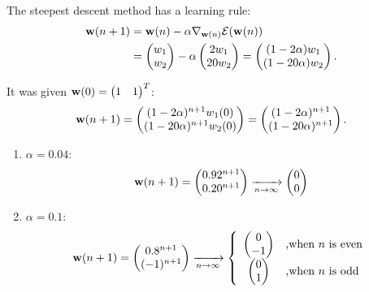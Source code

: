 \documentclass[10pt]{article}
\newcommand{\vw}{{\bf{w}}}
\begin{document}
\begin{enumerate}
The steepest descent method has a learning rule:
\begin{equation*}
  \begin{split}
    \vw(n+1) & = \vw(n)- \alpha \nabla_{\vw(n)} {\cal E} (\vw(n)) \\
    & = \begin{pmatrix} w_1 \\  w_2 \end{pmatrix} - \alpha
    \begin{pmatrix} 2 w_1 \\  20 w_2 \end{pmatrix} = \begin{pmatrix}
      (1 - 2 \alpha) w_1 \\  (1 - 20 \alpha) w_2 \end{pmatrix} .
  \end{split}
\end{equation*}

It was given $\vw(0) = \begin{pmatrix} 1 & 1 \end{pmatrix}^T$:
\begin{equation*}
    \vw(n+1) = \begin{pmatrix} (1 - 2 \alpha)^{n+1} w_1(0) \\  (1 - 20
      \alpha)^{n+1} w_2(0) \end{pmatrix} = \begin{pmatrix} (1 - 2
      \alpha)^{n+1} \\  (1 - 20 \alpha)^{n+1} \end{pmatrix}. 
\end{equation*}

\begin{enumerate}
\item $\alpha = 0.04$: 
\begin{equation*}
  \vw(n+1) = \begin{pmatrix} 0.92^{n+1} \\
    0.20^{n+1} \end{pmatrix} \xrightarrow[n\rightarrow\infty]{}\begin{pmatrix}0\\0\end{pmatrix}
\end{equation*}

\item $\alpha = 0.1$: 
\begin{equation*}
  \vw(n+1) = \begin{pmatrix} 0.8^{n+1} \\
    (-1)^{n+1} \end{pmatrix} \xrightarrow[n\rightarrow\infty]{}\left\{\begin{array}{cl}\begin{pmatrix}0\\-1\end{pmatrix} & \mbox{,when } n\mbox{ is even}\\
\begin{pmatrix}0\\1\end{pmatrix} & \mbox{,when } n\mbox{ is odd}\end{array}\right.
\end{equation*}


\end{enumerate}
\end{enumerate}
\end{document}
